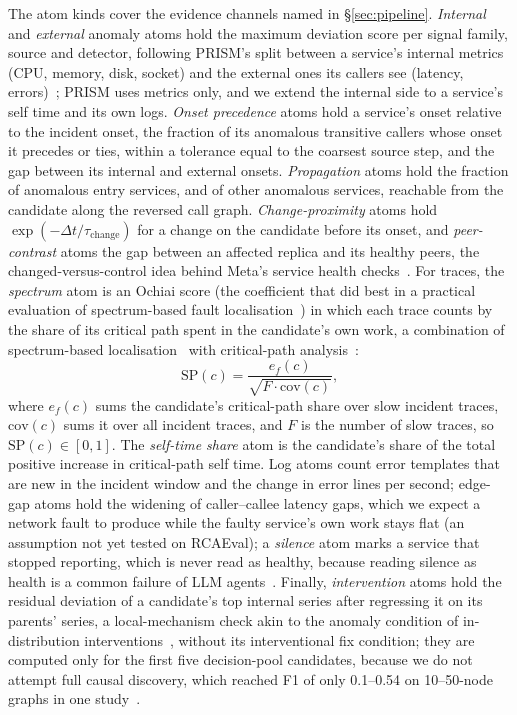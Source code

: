 The atom kinds cover the evidence channels named in \S\ref{sec:pipeline}.
\emph{Internal} and \emph{external} anomaly atoms hold the maximum deviation score per signal family, source and detector, following PRISM's split between a service's internal metrics (CPU, memory, disk, socket) and the external ones its callers see (latency, errors)~\cite{prism2026}; PRISM uses metrics only, and we extend the internal side to a service's self time and its own logs.
\emph{Onset precedence} atoms hold a service's onset relative to the incident onset, the fraction of its anomalous transitive callers whose onset it precedes or ties, within a tolerance equal to the coarsest source step, and the gap between its internal and external onsets.
\emph{Propagation} atoms hold the fraction of anomalous entry services, and of other anomalous services, reachable from the candidate along the reversed call graph.
\emph{Change-proximity} atoms hold $\exp(-\Delta t/\tau_\text{change})$ for a change on the candidate before its onset, and \emph{peer-contrast} atoms the gap between an affected replica and its healthy peers, the changed-versus-control idea behind Meta's service health checks~\cite{metahealth2026}.
For traces, the \emph{spectrum} atom is an Ochiai score (the coefficient that did best in a practical evaluation of spectrum-based fault localisation~\cite{abreu2009ochiai}) in which each trace counts by the share of its critical path spent in the candidate's own work, a combination of spectrum-based localisation~\cite{tracerca} with critical-path analysis~\cite{crisp2022}:
\begin{equation}
\text{SP}(c) = \frac{e_f(c)}{\sqrt{F \cdot \text{cov}(c)}},
\end{equation}
where $e_f(c)$ sums the candidate's critical-path share over slow incident traces, $\text{cov}(c)$ sums it over all incident traces, and $F$ is the number of slow traces, so $\text{SP}(c) \in [0,1]$.
The \emph{self-time share} atom is the candidate's share of the total positive increase in critical-path self time.
Log atoms count error templates that are new in the incident window and the change in error lines per second; edge-gap atoms hold the widening of caller--callee latency gaps, which we expect a network fault to produce while the faulty service's own work stays flat (an assumption not yet tested on RCAEval); a \emph{silence} atom marks a service that stopped reporting, which is never read as healthy, because reading silence as health is a common failure of LLM agents~\cite{diagguard2026}.
Finally, \emph{intervention} atoms hold the residual deviation of a candidate's top internal series after regressing it on its parents' series, a local-mechanism check akin to the anomaly condition of in-distribution interventions~\cite{idi2025}, without its interventional fix condition; they are computed only for the first five decision-pool candidates, because we do not attempt full causal discovery, which reached F1 of only 0.1--0.54 on 10--50-node graphs in one study~\cite{causalinference2024ase}.

